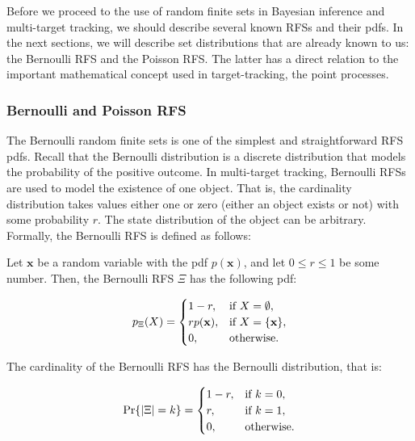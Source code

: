 Before we proceed to the use of random finite sets in Bayesian inference and multi-target tracking, we should describe several known RFSs and their pdfs. In the next sections, we will describe set distributions that are already known to us: the Bernoulli RFS and the Poisson RFS. The latter has a direct relation to the important mathematical concept used in target-tracking, the point processes.

\subsubsection{Bernoulli and Poisson RFS}

The Bernoulli random finite sets is one of the simplest and straightforward RFS pdfs. Recall that the Bernoulli distribution is a discrete distribution that models the probability of the positive outcome. In multi-target tracking, Bernoulli RFSs are used to model the existence of one object. That is, the cardinality distribution takes values either one or zero (either an object exists or not) with some probability $r$. The state distribution of the object can be arbitrary. Formally, the Bernoulli RFS is defined as follows:

\begin{definition}
    Let $\mathbf{x}$ be a random variable with the pdf $p(\mathbf{x})$, and let $0 \leq r \leq 1$ be some number. Then, the Bernoulli RFS $\Xi$ has the following pdf:

    \begin{equation}
        p_\Xi(X) =
        \begin{cases}
            1 - r, & \textup{if } X = \emptyset, \\
            r p(\mathbf{x}), & \textup{if } X = \{\mathbf{x}\}, \\
            0, & \textup{otherwise}.
        \end{cases}
    \end{equation}

    The cardinality of the Bernoulli RFS has the Bernoulli distribution, that is:

    \begin{equation}
        \Pr{|\Xi| = k} = \begin{cases}
            1 - r, & \textup{if } k = 0, \\
            r, & \textup{if } k = 1, \\
            0, & \textup{otherwise}.
        \end{cases}
    \end{equation}
\end{definition}

